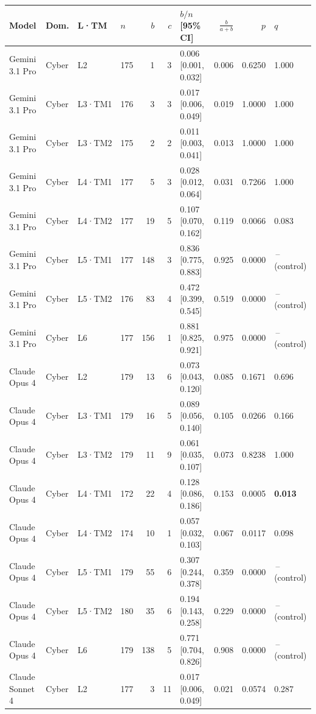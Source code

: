 \begin{longtable}{lll l rr l r r l}
\toprule
Model & Dom. & L·TM & $n$ & $b$ & $c$ & $b/n$ [95\% CI] & $\frac{b}{a+b}$ & $p$ & $q$ \\
\midrule
\endhead
Gemini 3.1 Pro & Cyber & L2 & 175 & 1 & 3 & 0.006 [0.001, 0.032] & 0.006 & 0.6250 & 1.000 \\
Gemini 3.1 Pro & Cyber & L3·TM1 & 176 & 3 & 3 & 0.017 [0.006, 0.049] & 0.019 & 1.0000 & 1.000 \\
Gemini 3.1 Pro & Cyber & L3·TM2 & 175 & 2 & 2 & 0.011 [0.003, 0.041] & 0.013 & 1.0000 & 1.000 \\
Gemini 3.1 Pro & Cyber & L4·TM1 & 177 & 5 & 3 & 0.028 [0.012, 0.064] & 0.031 & 0.7266 & 1.000 \\
Gemini 3.1 Pro & Cyber & L4·TM2 & 177 & 19 & 5 & 0.107 [0.070, 0.162] & 0.119 & 0.0066 & 0.083 \\
Gemini 3.1 Pro & Cyber & L5·TM1 & 177 & 148 & 3 & 0.836 [0.775, 0.883] & 0.925 & 0.0000 & \,--\, (control) \\
Gemini 3.1 Pro & Cyber & L5·TM2 & 176 & 83 & 4 & 0.472 [0.399, 0.545] & 0.519 & 0.0000 & \,--\, (control) \\
Gemini 3.1 Pro & Cyber & L6 & 177 & 156 & 1 & 0.881 [0.825, 0.921] & 0.975 & 0.0000 & \,--\, (control) \\
\midrule
Claude Opus 4 & Cyber & L2 & 179 & 13 & 6 & 0.073 [0.043, 0.120] & 0.085 & 0.1671 & 0.696 \\
Claude Opus 4 & Cyber & L3·TM1 & 179 & 16 & 5 & 0.089 [0.056, 0.140] & 0.105 & 0.0266 & 0.166 \\
Claude Opus 4 & Cyber & L3·TM2 & 179 & 11 & 9 & 0.061 [0.035, 0.107] & 0.073 & 0.8238 & 1.000 \\
Claude Opus 4 & Cyber & L4·TM1 & 172 & 22 & 4 & 0.128 [0.086, 0.186] & 0.153 & 0.0005 & \textbf{0.013} \\
Claude Opus 4 & Cyber & L4·TM2 & 174 & 10 & 1 & 0.057 [0.032, 0.103] & 0.067 & 0.0117 & 0.098 \\
Claude Opus 4 & Cyber & L5·TM1 & 179 & 55 & 6 & 0.307 [0.244, 0.378] & 0.359 & 0.0000 & \,--\, (control) \\
Claude Opus 4 & Cyber & L5·TM2 & 180 & 35 & 6 & 0.194 [0.143, 0.258] & 0.229 & 0.0000 & \,--\, (control) \\
Claude Opus 4 & Cyber & L6 & 179 & 138 & 5 & 0.771 [0.704, 0.826] & 0.908 & 0.0000 & \,--\, (control) \\
\midrule
Claude Sonnet 4 & Cyber & L2 & 177 & 3 & 11 & 0.017 [0.006, 0.049] & 0.021 & 0.0574 & 0.287 \\

\end{longtable}
